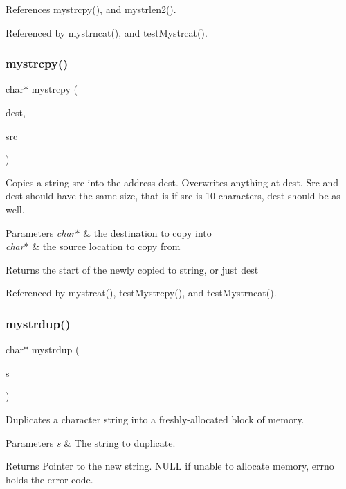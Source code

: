 References mystrcpy(), and mystrlen2().



Referenced by mystrncat(), and test\+Mystrcat().

\mbox{\label{mystring_8h_acce8ca34ad672c764b2817e5f91707d6}} 
\subsubsection{mystrcpy()}
{\footnotesize\ttfamily char$\ast$ mystrcpy (\begin{DoxyParamCaption}\item[{char $\ast$}]{dest,  }\item[{char $\ast$}]{src }\end{DoxyParamCaption})}

Copies a string src into the address dest. Overwrites anything at dest. Src and dest should have the same size, that is if src is 10 characters, dest should be as well. 
\begin{DoxyParams}{Parameters}
{\em char$\ast$} & the destination to copy into \\
\hline
{\em char$\ast$} & the source location to copy from \\
\hline
\end{DoxyParams}
\begin{DoxyReturn}{Returns}
the start of the newly copied to string, or just dest 
\end{DoxyReturn}


Referenced by mystrcat(), test\+Mystrcpy(), and test\+Mystrncat().

\mbox{\label{mystring_8h_afd0ffd16b17423165bbba7ccadac9375}} 
\subsubsection{mystrdup()}
{\footnotesize\ttfamily char$\ast$ mystrdup (\begin{DoxyParamCaption}\item[{char $\ast$}]{s }\end{DoxyParamCaption})}

Duplicates a character string into a freshly-\/allocated block of memory. 
\begin{DoxyParams}{Parameters}
{\em s} & The string to duplicate. \\
\hline
\end{DoxyParams}
\begin{DoxyReturn}{Returns}
Pointer to the new string. N\+U\+LL if unable to allocate memory, errno holds the error code. 
\end{DoxyReturn}


